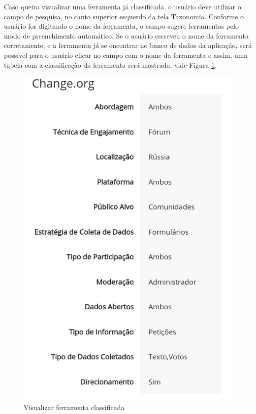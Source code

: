 \par
Caso queira visualizar uma ferramenta já classificada, o usuário deve utilizar o campo de pesquisa, no canto superior esquerdo da tela Taxonomia.
Conforme o usuário for digitando o nome da ferramenta, o campo sugere ferramentas pelo modo de preenchimento automático. Se o usuário escreveu o nome da ferramenta corretamente, 
e a ferramenta já se encontrar no banco de dados da aplicação, será possível para o usuário clicar no campo com o nome da ferramenta e assim, uma tabela com a classificação da 
ferramenta será mostrada, vide Figura \ref{fig:show-ferramenta}.

\vspace{0.5cm}

\begin{figure}[!ht]
    \centering
    \includegraphics[scale=0.20]{./figuras/show-ferramenta.png}
    \caption{Visualizar ferramenta classificada}
    \label{fig:show-ferramenta}
\end{figure}


